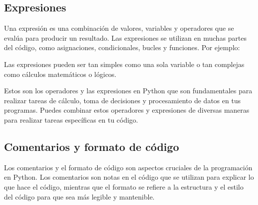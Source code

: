 \subsection{Expresiones}
Una expresión es una combinación de valores, variables y operadores que se evalúa para producir un resultado. Las expresiones se utilizan en muchas partes del código, como asignaciones, condicionales, bucles y funciones. Por ejemplo:\\

\begin{figure}[h]
    \centering
  \end{figure}
Las expresiones pueden ser tan simples como una sola variable o tan complejas como cálculos matemáticos o lógicos.

Estos son los operadores y las expresiones en Python que son fundamentales para realizar tareas de cálculo, toma de decisiones y procesamiento de datos en tus programas. Puedes combinar estos operadores y expresiones de diversas maneras para realizar tareas específicas en tu código.

\subsection{Comentarios y formato de código}
Los comentarios y el formato de código son aspectos cruciales de la programación en Python. Los comentarios son notas en el código que se utilizan para explicar lo que hace el código, mientras que el formato se refiere a la estructura y el estilo del código para que sea más legible y mantenible.\\

